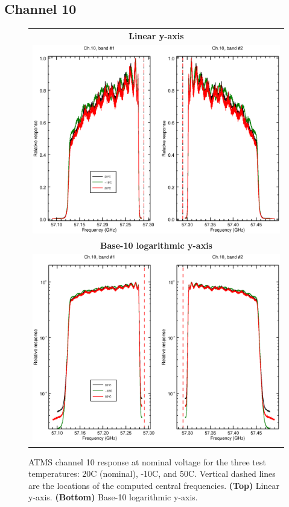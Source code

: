 \subsection{Channel 10}
\begin{figure}[H]
  \label{fig:Tset.ch10_response}
  \centering
  \begin{tabular}{c}
    \hspace{0.75cm}\sffamily\textbf{Linear y-axis} \\
    \includegraphics[scale=0.55]{graphics/srf/Tset/lin/atms_npp-10.eps} \\
    \hspace{0.75cm}\sffamily\textbf{Base-10 logarithmic y-axis} \\
    \includegraphics[scale=0.55]{graphics/srf/Tset/log/atms_npp-10.eps}
  \end{tabular}
  \caption{ATMS channel 10 response at nominal voltage for the three test temperatures: 20\textdegree{}C (nominal), -10\textdegree{}C, and 50\textdegree{}C. Vertical dashed lines are the locations of the computed central frequencies. \textbf{(Top)} Linear y-axis. \textbf{(Bottom)} Base-10 logarithmic y-axis.}
\end{figure}

